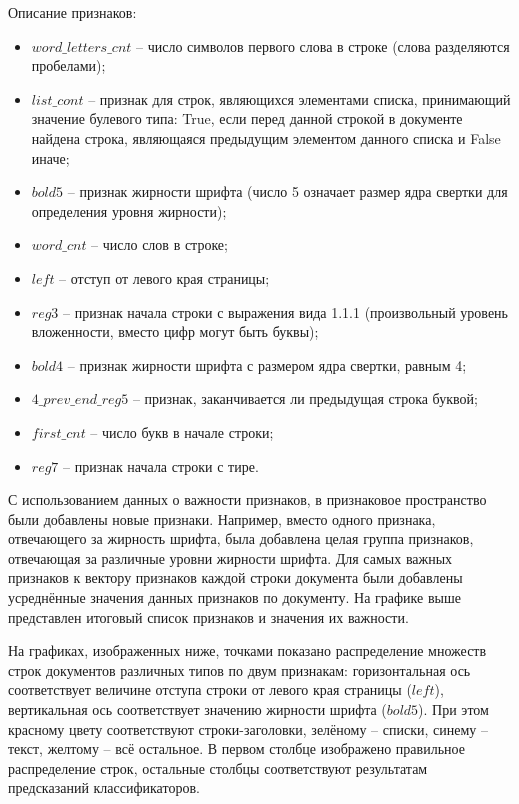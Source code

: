 \documentclass[a4paper,12pt]{article}
\begin{document}
Описание признаков:

\begin{itemize}

	\item $word\_letters\_cnt$ -- число символов первого слова в строке (слова разделяются пробелами);
	\item $list\_cont$ -- признак для строк, являющихся элементами списка, принимающий значение булевого типа: True, если перед данной строкой в документе найдена строка, являющаяся предыдущим элементом данного списка и False иначе;
	\item $bold5$ -- признак жирности шрифта (число 5 означает размер ядра свертки для определения уровня жирности);
	\item $word\_cnt$ -- число слов в строке;
	\item $left$ -- отступ от левого края страницы;
	\item $reg3$ -- признак начала строки с выражения вида 1.1.1 (произвольный уровень вложенности, вместо цифр могут быть буквы);
	\item $bold4$ -- признак жирности шрифта с размером ядра свертки, равным 4;
	\item $4\_prev\_end\_reg5$ -- признак, заканчивается ли предыдущая строка буквой;
	\item $first\_cnt$ -- число букв в начале строки;
	\item $reg7$ -- признак начала строки с тире.

\end{itemize}

С использованием данных о важности признаков, в признаковое пространство были добавлены новые признаки. Например, вместо одного признака, отвечающего за жирность шрифта, была добавлена целая группа признаков, отвечающая за различные уровни жирности шрифта. Для самых важных признаков к вектору признаков каждой строки документа были добавлены усреднённые значения данных признаков по документу. На графике выше представлен итоговый список признаков и значения их важности.

На графиках, изображенных ниже, точками показано распределение множеств строк документов различных типов по двум признакам: горизонтальная ось соответствует величине отступа строки от левого края страницы ($left$), вертикальная ось соответствует значению жирности шрифта ($bold5$). При этом красному цвету соответствуют строки-заголовки, зелёному -- списки, синему -- текст, желтому -- всё остальное. В первом столбце изображено правильное распределение строк, остальные столбцы соответствуют результатам предсказаний классификаторов.
\end{document}
